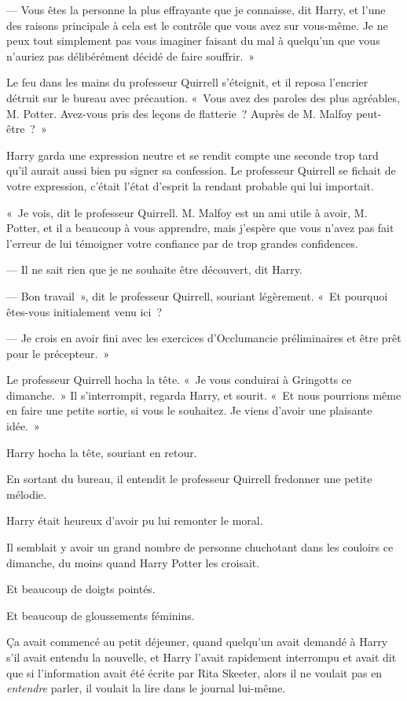 --- Vous êtes la personne la plus effrayante que je connaisse, dit Harry, et l'une des raisons principale à cela est le contrôle que vous avez sur vous-même.
Je ne peux tout simplement pas vous imaginer faisant du mal à quelqu'un que vous n'auriez pas délibérément décidé de faire souffrir.~»

Le feu dans les mains du professeur Quirrell s'éteignit, et il reposa l'encrier détruit sur le bureau avec précaution.
«~Vous avez des paroles des plus agréables, M. Potter.
Avez-vous pris des leçons de flatterie~?
Auprès de M. Malfoy peut-être~?~»

Harry garda une expression neutre et se rendit compte une seconde trop tard qu'il aurait aussi bien pu signer sa confession.
Le professeur Quirrell se fichait de votre expression, c'était l'état d'esprit la rendant probable qui lui importait.

«~Je vois, dit le professeur Quirrell.
M. Malfoy est un ami utile à avoir, M. Potter, et il a beaucoup à vous apprendre, mais j'espère que vous n'avez pas fait l'erreur de lui témoigner votre confiance par de trop grandes confidences.

--- Il ne sait rien que je ne souhaite être découvert, dit Harry.

--- Bon travail~», dit le professeur Quirrell, souriant légèrement.
«~Et pourquoi êtes-vous initialement venu ici~?

--- Je crois en avoir fini avec les exercices d'Occlumancie préliminaires et être prêt pour le précepteur.~»

Le professeur Quirrell hocha la tête.
«~Je vous conduirai à Gringotts ce dimanche.~»
Il s'interrompit, regarda Harry, et sourit.
«~Et nous pourrions même en faire une petite sortie, si vous le souhaitez.
Je viens d'avoir une plaisante idée.~»

Harry hocha la tête, souriant en retour.

En sortant du bureau, il entendit le professeur Quirrell fredonner une petite mélodie.

Harry était heureux d'avoir pu lui remonter le moral.

\later

Il semblait y avoir un grand nombre de personne chuchotant dans les couloirs ce dimanche, du moins quand Harry Potter les croisait.

Et beaucoup de doigts pointés.

Et beaucoup de gloussements féminins.

Ça avait commencé au petit déjeuner, quand quelqu'un avait demandé à Harry s'il avait entendu la nouvelle, et Harry l'avait rapidement interrompu et avait dit que si l'information avait été écrite par Rita Skeeter, alors il ne voulait pas en \emph{entendre} parler, il voulait la lire dans le journal lui-même.

